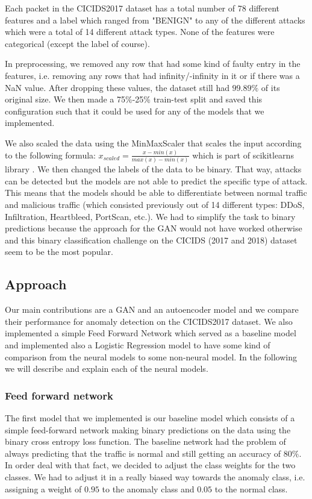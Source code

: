 \documentclass[]{article}
\begin{document}
	 Each packet in the CICIDS2017 dataset has a total number of 78 different features and a label which ranged from "BENIGN" to any of the different attacks which were a total of 14 different attack types. None of the features were categorical (except the label of course). 
	 \newline
	 
	 
	 \noindent
	 In preprocessing, we removed any row that had some kind of faulty entry in the features, i.e. removing any rows that had infinity/-infinity in it or if there was a NaN value. After dropping these values, the dataset still had $99.89\%$ of its original size. We then made a 75\%-25\% train-test split and saved this configuration such that it could be used for any of the models that we implemented. 
	 
	 We also scaled the data using the MinMaxScaler that scales the input according to the following formula: $x_{scaled} = \frac{x-min(x)}{max(x)-min(x)}$ which is part of scikitlearns library \cite{sklearn_api}. We then changed the labels of the data to be binary. That way, attacks can be detected but the models are not able to predict the specific type of attack. This means that the models should be able to differentiate between normal traffic and malicious traffic (which consisted previously out of 14 different types: DDoS, Infiltration, Heartbleed, PortScan, etc.). We had to simplify the task to binary predictions because the approach for the GAN would not have worked otherwise and this binary classification challenge on the CICIDS (2017 and 2018) dataset seem to be the most popular. 

	 \subsection{Approach}

	 Our main contributions are a GAN and an autoencoder model and we compare their performance for anomaly detection on the CICIDS2017 dataset. We also implemented a simple Feed Forward Network which served as a baseline model and implemented also a Logistic Regression model to have some kind of comparison from the neural models to some non-neural model. In the following we will describe and explain each of the neural models.

	 
		
	  \subsubsection{Feed forward network}
	 The first model that we implemented is our baseline model which consists of a simple feed-forward network making binary predictions on the data using the binary cross entropy loss function. The baseline network had the problem of always predicting that the traffic is normal and still getting an accuracy of $80\%$. In order deal with that fact, we decided to adjust the class weights for the two classes. We had to adjust it in a really biased way towards the anomaly class, i.e. assigning a weight of $0.95$ to the anomaly class and $0.05$ to the normal class. 
\end{document}

